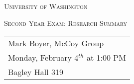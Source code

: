 % 
% 

\begin{titlepage}
	\centering
	{\scshape\LARGE University of Washington \par}
	\vspace{1cm}
	{\scshape\Large Second Year Exam: Research Summary\par}
	\vspace{1.5cm}
	{\huge\bfseries {}\par}
	\vspace{2cm}
	{\Large
    \begin{tabular}{l}
      Mark Boyer, McCoy Group \\
      Monday, February 4$^{th}$ at 1:00 PM \\
      Bagley Hall 319
    \end{tabular}
    \par
    }

  \vfill
  \begin{abstract}
  \end{abstract}
  \vfill

\end{titlepage}

\setcounter{page}{1}

% 
